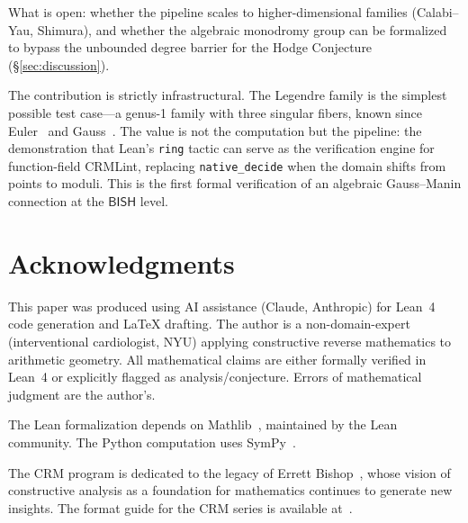 \documentclass[11pt]{article}
\theoremstyle{plain}
\theoremstyle{definition}
\theoremstyle{remark}
\newcommand{\BISH}{\mathsf{BISH}}
\begin{document}
What is open: whether the pipeline scales to higher-dimensional
families (Calabi--Yau, Shimura), and whether the algebraic
monodromy group can be formalized to bypass the unbounded degree
barrier for the Hodge Conjecture (\S\ref{sec:discussion}).

The contribution is strictly infrastructural.  The Legendre family is
the simplest possible test case---a genus-1 family with three singular
fibers, known since Euler~\cite{Euler1768} and Gauss~\cite{Gauss1812}.  The value is not the computation but
the pipeline: the demonstration that Lean's \texttt{ring} tactic
can serve as the verification engine for function-field CRMLint,
replacing \texttt{native\_decide} when the domain shifts from
points to moduli.  This is the first formal verification of an
algebraic Gauss--Manin connection at the $\BISH$ level.


\section*{Acknowledgments}

This paper was produced using AI assistance (Claude, Anthropic)
for Lean~4 code generation and LaTeX drafting.  The author is
a non-domain-expert (interventional cardiologist, NYU) applying
constructive reverse mathematics to arithmetic geometry.
All mathematical claims are either formally verified in Lean~4
or explicitly flagged as analysis/conjecture.  Errors of
mathematical judgment are the author's.

The Lean formalization depends on Mathlib~\cite{Mathlib4},
maintained by the Lean community.  The Python computation uses
SymPy~\cite{SymPy2017}.

The CRM program is dedicated to the legacy of
Errett Bishop~\cite{Bishop1967}, whose vision of constructive
analysis as a foundation for mathematics continues to generate
new insights.  The format guide for the CRM series is
available at~\cite{FormatGuide}.
\end{document}
